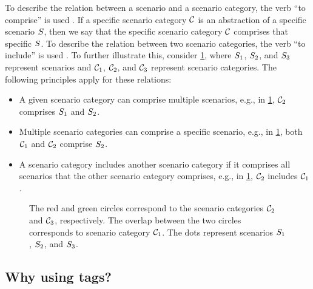 To describe the relation between a scenario and a scenario category, the verb ``to comprise'' is used \autocite{degelder2020ontology}.
If a specific scenario category $\mathcal{C}$ is an abstraction of a specific scenario $S$, then we say that the specific scenario category $\mathcal{C}$ comprises that specific $S$. 
To describe the relation between two scenario categories, the verb ``to include'' is used \autocite{degelder2020ontology}. 
To further illustrate this, consider \cref{fig:venn diagram scenario category}, where $S_{1}$, $S_{2}$, and $S_{3}$ represent scenarios and $\mathcal{C}_{1}$, $\mathcal{C}_{2}$, and $\mathcal{C}_{3}$ represent scenario categories.
The following principles apply for these relations:
\begin{itemize}
	\item A given scenario category can comprise multiple scenarios, e.g., in \cref{fig:venn diagram scenario category}, $\mathcal{C}_{2}$ comprises $S_{1}$ and $S_{2}$.
	\item Multiple scenario categories can comprise a specific scenario, e.g., in \cref{fig:venn diagram scenario category}, both $\mathcal{C}_{1}$ and $\mathcal{C}_{2}$ comprise $S_{2}$. 
	\item A scenario category includes another scenario category if it comprises all scenarios that the other scenario category comprises, e.g., in \cref{fig:venn diagram scenario category}, $\mathcal{C}_{2}$ includes $\mathcal{C}_{1}$.
\end{itemize}

\setlength{\venncircle}{6em}
\begin{figure}[h]
	\centering
	
	\caption{The red and green circles correspond to the scenario categories $\mathcal{C}_{2}$ and $\mathcal{C}_{3}$, respectively. The overlap between the two circles corresponds to scenario category $\mathcal{C}_{1}$. The dots represent scenarios $S_{1}$, $S_{2}$, and $S_{3}$.}
	\label{fig:venn diagram scenario category}
\end{figure}



\subsection{Why using tags?}
\label{sec:tags for scenario catgories}

